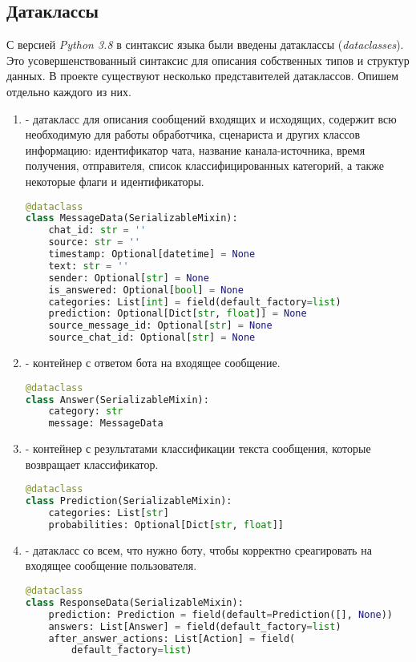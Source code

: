     \subsection{Датаклассы}
    С версией \textit{Python 3.8} в синтаксис языка были введены датаклассы (\textit{dataclasses}).
    Это усовершенствованный синтаксис для описания собственных типов и структур данных.
    В проекте существуют несколько представителей датаклассов. Опишем отдельно каждого из них.
    \begin{enumerate}
        \item {} - датакласс для описания сообщений входящих и исходящих,
        содержит всю необходимую для работы обработчика, сценариста и других классов информацию:
        идентификатор чата, название канала-источника, время получения, отправителя,
        список классифицированных категорий, а также некоторые флаги и идентификаторы.
\begin{lstlisting}[language=Python]
@dataclass
class MessageData(SerializableMixin):
    chat_id: str = ''
    source: str = ''
    timestamp: Optional[datetime] = None
    text: str = ''
    sender: Optional[str] = None
    is_answered: Optional[bool] = None
    categories: List[int] = field(default_factory=list)
    prediction: Optional[Dict[str, float]] = None
    source_message_id: Optional[str] = None
    source_chat_id: Optional[str] = None
\end{lstlisting}

        \item {} - контейнер с ответом бота на входящее сообщение.
\begin{lstlisting}[language=Python]
@dataclass
class Answer(SerializableMixin):
    category: str
    message: MessageData
\end{lstlisting}

        \item {} - контейнер с результатами классификации текста сообщения,
        которые возвращает классификатор.
\begin{lstlisting}[language=Python]
@dataclass
class Prediction(SerializableMixin):
    categories: List[str]
    probabilities: Optional[Dict[str, float]]
\end{lstlisting}

        \item {} - датакласс со всем, что нужно боту, чтобы корректно
        среагировать на входящее сообщение пользователя.
\begin{lstlisting}[language=Python]
@dataclass
class ResponseData(SerializableMixin):
    prediction: Prediction = field(default=Prediction([], None))
    answers: List[Answer] = field(default_factory=list)
    after_answer_actions: List[Action] = field(
        default_factory=list)
\end{lstlisting}
    \end{enumerate}

